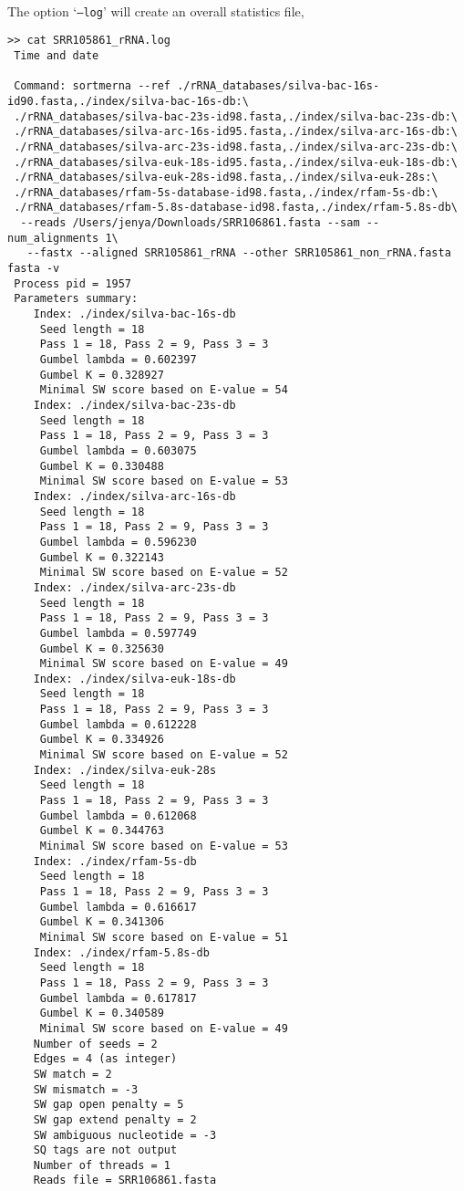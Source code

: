 \documentclass[10pt,a4paper]{article}
\begin{document}
~\\
\noindent The option `\texttt{--log}' will create an overall statistics file,\\

\begin{Verbatim}[fontsize=\footnotesize]
>> cat SRR105861_rRNA.log 
 Time and date

 Command: sortmerna --ref ./rRNA_databases/silva-bac-16s-id90.fasta,./index/silva-bac-16s-db:\
 ./rRNA_databases/silva-bac-23s-id98.fasta,./index/silva-bac-23s-db:\
 ./rRNA_databases/silva-arc-16s-id95.fasta,./index/silva-arc-16s-db:\
 ./rRNA_databases/silva-arc-23s-id98.fasta,./index/silva-arc-23s-db:\
 ./rRNA_databases/silva-euk-18s-id95.fasta,./index/silva-euk-18s-db:\
 ./rRNA_databases/silva-euk-28s-id98.fasta,./index/silva-euk-28s:\
 ./rRNA_databases/rfam-5s-database-id98.fasta,./index/rfam-5s-db:\
 ./rRNA_databases/rfam-5.8s-database-id98.fasta,./index/rfam-5.8s-db\
  --reads /Users/jenya/Downloads/SRR106861.fasta --sam --num_alignments 1\
   --fastx --aligned SRR105861_rRNA --other SRR105861_non_rRNA.fasta fasta -v 
 Process pid = 1957
 Parameters summary:
    Index: ./index/silva-bac-16s-db
     Seed length = 18
     Pass 1 = 18, Pass 2 = 9, Pass 3 = 3
     Gumbel lambda = 0.602397
     Gumbel K = 0.328927
     Minimal SW score based on E-value = 54
    Index: ./index/silva-bac-23s-db
     Seed length = 18
     Pass 1 = 18, Pass 2 = 9, Pass 3 = 3
     Gumbel lambda = 0.603075
     Gumbel K = 0.330488
     Minimal SW score based on E-value = 53
    Index: ./index/silva-arc-16s-db
     Seed length = 18
     Pass 1 = 18, Pass 2 = 9, Pass 3 = 3
     Gumbel lambda = 0.596230
     Gumbel K = 0.322143
     Minimal SW score based on E-value = 52
    Index: ./index/silva-arc-23s-db
     Seed length = 18
     Pass 1 = 18, Pass 2 = 9, Pass 3 = 3
     Gumbel lambda = 0.597749
     Gumbel K = 0.325630
     Minimal SW score based on E-value = 49
    Index: ./index/silva-euk-18s-db
     Seed length = 18
     Pass 1 = 18, Pass 2 = 9, Pass 3 = 3
     Gumbel lambda = 0.612228
     Gumbel K = 0.334926
     Minimal SW score based on E-value = 52
    Index: ./index/silva-euk-28s
     Seed length = 18
     Pass 1 = 18, Pass 2 = 9, Pass 3 = 3
     Gumbel lambda = 0.612068
     Gumbel K = 0.344763
     Minimal SW score based on E-value = 53
    Index: ./index/rfam-5s-db
     Seed length = 18
     Pass 1 = 18, Pass 2 = 9, Pass 3 = 3
     Gumbel lambda = 0.616617
     Gumbel K = 0.341306
     Minimal SW score based on E-value = 51
    Index: ./index/rfam-5.8s-db
     Seed length = 18
     Pass 1 = 18, Pass 2 = 9, Pass 3 = 3
     Gumbel lambda = 0.617817
     Gumbel K = 0.340589
     Minimal SW score based on E-value = 49
    Number of seeds = 2
    Edges = 4 (as integer)
    SW match = 2
    SW mismatch = -3
    SW gap open penalty = 5
    SW gap extend penalty = 2
    SW ambiguous nucleotide = -3
    SQ tags are not output
    Number of threads = 1
    Reads file = SRR106861.fasta


\end{Verbatim}
\end{document}
